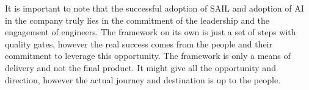 \documentclass[]{imc-inf}
\begin{document}
It is important to note that the successful adoption of SAIL and
adoption of AI in the company truly lies in the commitment of the
leadership and the engagement of engineers. The framework on its own is
just a set of steps with quality gates, however the real success comes
from the people and their commitment to leverage this opportunity. The
framework is only a means of delivery and not the final product. It
might give all the opportunity and direction, however the actual journey
and destination is up to the people.

\backmatter
	

\end{document}
